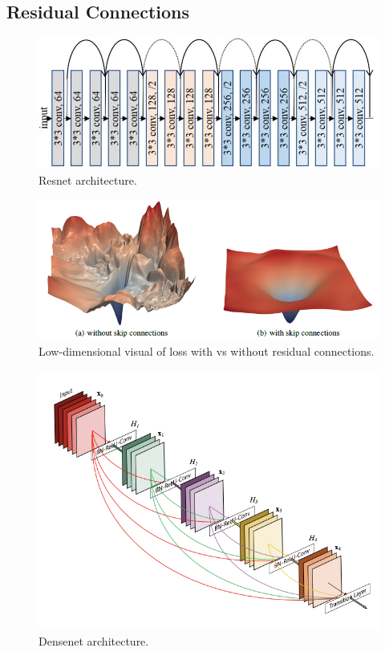 \subsection{Residual Connections} 

  \begin{figure}[H]
    \centering 
    \includegraphics[scale=0.4]{img/02_Control/resnet_arch.png}
    \caption{Resnet architecture. } 
    \label{fig:resnet_arch}
  \end{figure}

  \begin{figure}[H]
    \centering 
    \includegraphics[scale=0.4]{img/02_Control/resnet_loss.png}
    \caption{Low-dimensional visual of loss with vs without residual connections. } 
    \label{fig:resnet_loss}
  \end{figure}

  \begin{figure}[H]
    \centering 
    \includegraphics[scale=0.4]{img/02_Control/densenet.png}
    \caption{Densenet architecture. } 
    \label{fig:densenet_architecture}
  \end{figure}

